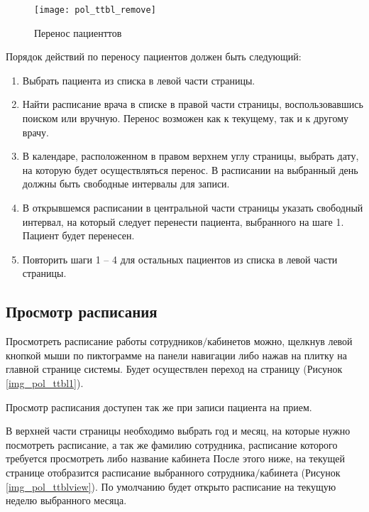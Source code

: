 {\begin{figure}[ht]\centering
 \texttt{[image: pol\_ttbl\_remove]}
 \caption{Перенос пациенттов}
 \label{img_pol_ttbl_remove}
\end{figure}

Порядок действий по переносу пациентов должен быть следующий: 

\begin{enumerate}
 \item Выбрать пациента из списка в левой части страницы.
 \item Найти расписание врача в списке в правой части страницы, воспользовавшись поиском или вручную. Перенос возможен как к текущему, так и к другому врачу.
 \item В календаре, расположенном в правом верхнем углу страницы, выбрать дату, на которую будет осуществляться перенос. В расписании на выбранный день должны быть свободные интервалы для записи.
 \item В открывшемся расписании в центральной части страницы указать свободный интервал, на который следует перенести пациента, выбранного на шаге 1. Пациент будет перенесен.
 \item Повторить шаги 1 -- 4 для остальных пациентов из списка в левой части страницы.
\end{enumerate}

}{}

\subsection{Просмотр расписания} \label{pol_ttbl_view}

Просмотреть расписание работы сотрудников$\slash$кабинетов можно, щелкнув левой кнопкой мыши по пиктограмме  на панели навигации либо нажав на плитку  на главной странице системы. Будет осуществлен переход на страницу  (Рисунок \ref{img_pol_ttbl1}).

\begin{prim}
 Просмотр расписания доступен так же при записи пациента на прием.
\end{prim}

В верхней части страницы необходимо выбрать год и месяц, на которые нужно посмотреть расписание, а так же фамилию сотрудника, расписание которого требуется просмотреть либо название кабинета   После этого ниже, на текущей  странице отобразится расписание выбранного сотрудника$\slash$кабинета (Рисунок \ref{img_pol_ttblview}). По умолчанию будет открыто расписание на текущую неделю выбранного месяца. 


